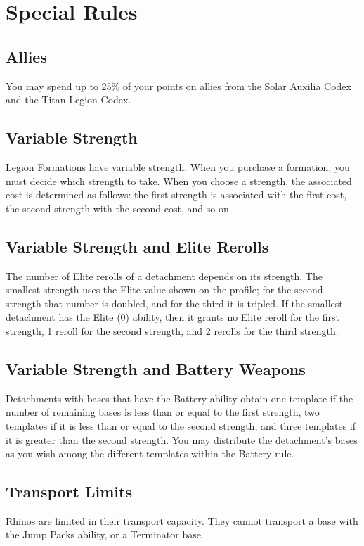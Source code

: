 \section{Special Rules}

\subsection{Allies}

You may spend up to 25\% of your points on allies from the Solar Auxilia Codex and the Titan Legion Codex.

\subsection{Variable Strength}

Legion Formations have variable strength. When you purchase a formation, you must decide which strength to take. When you choose a strength, the associated cost is determined as follows: the first strength is associated with the first cost, the second strength with the second cost, and so on.

\subsection{Variable Strength and Elite Rerolls}

The number of Elite rerolls of a detachment depends on its strength. The smallest strength uses the Elite value shown on the profile; for the second strength that number is doubled, and for the third it is tripled. If the smallest detachment has the Elite (0) ability, then it grants no Elite reroll for the first strength, 1 reroll for the second strength, and 2 rerolls for the third strength.

\subsection{Variable Strength and Battery Weapons}

Detachments with bases that have the Battery ability obtain one template if the number of remaining bases is less than or equal to the first strength, two templates if it is less than or equal to the second strength, and three templates if it is greater than the second strength. You may distribute the detachment's bases as you wish among the different templates within the Battery rule.

\subsection{Transport Limits}

Rhinos are limited in their transport capacity. They cannot transport a base with the Jump Packs ability, or a Terminator base.
